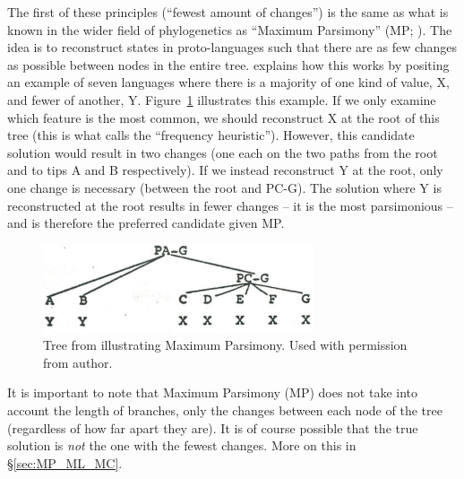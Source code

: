 \documentclass[12pt,letterpaper]{article}
\begin{document}
The first of these principles (``fewest amount of changes'') is the same as what is known in the wider field of phylogenetics as ``Maximum Parsimony'' (MP; \citealt{felsenstein2004inferring}). The idea is to reconstruct states in proto-languages such that there are as few changes as possible between nodes in the entire tree. \citet[17--22]{clark1973aspects} explains how this works by positing an example of seven languages where there is a majority of one kind of value, X, and fewer of another, Y. Figure~\ref{fig:clark_tree} illustrates this example. If we only examine which feature is the most common, we should reconstruct X at the root of this tree (this is what \citealt{goldstein_2022} calls the ``frequency heuristic''). However, this candidate solution would result in two changes (one each on the two paths from the root and to tips A and B respectively). If we instead reconstruct Y at the root, only one change is necessary (between the root and PC-G). The solution where Y is reconstructed at the root results in fewer changes -- it is the most parsimonious -- and is therefore the preferred candidate given MP.
 
\begin{figure}[ht]
\centering
\includegraphics[width=8cm]{illustrations/Clark_1977_tree.png}
\caption{{Tree from \citet[19]{clark1973aspects} illustrating Maximum Parsimony. Used with permission from author.}}
\label{fig:clark_tree}
\end{figure}

It is important to note that Maximum Parsimony (MP) does not take into account the length of branches, only the changes between each node of the tree (regardless of how far apart they are). It is of course possible that the true solution is \textit{not} the one with the fewest changes. More on this in §\ref{sec:MP_ML_MC}.
\end{document}
